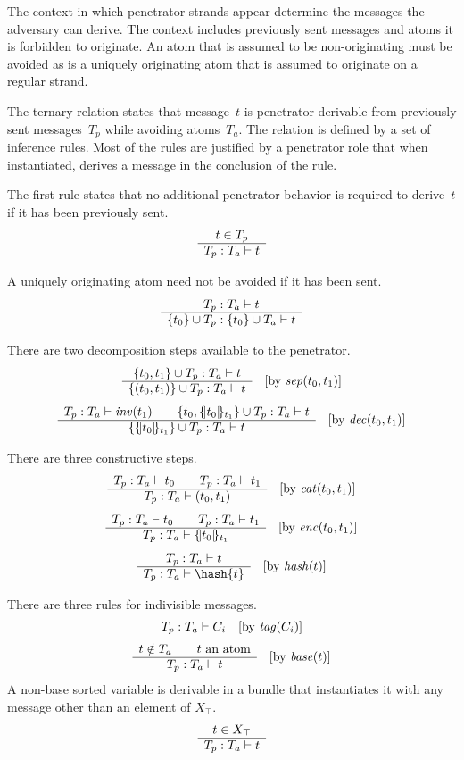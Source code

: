 \documentclass[12pt]{report}
\theoremstyle{definition}
\begin{document}
The context in which penetrator strands appear determine the messages
the adversary can derive.  The context includes previously sent
messages and atoms it is forbidden to originate.  An atom that is
assumed to be non-originating must be avoided as is a uniquely
originating atom that is assumed to originate on a regular strand.

The ternary relation  states that message~$t$ is
penetrator derivable from previously sent messages~$T_p$ while
avoiding atoms~$T_a$.  The relation is defined by a set of inference
rules.  Most of the rules are justified by a penetrator role that when
instantiated, derives a message in the conclusion of the rule.

The first rule states that no additional penetrator behavior is required
to derive~$t$ if it has been previously sent.
$$\infer{t\in{T_p}}{\der{t}{T_p}{T_a}}$$

A uniquely originating atom need not be avoided if it has been sent.
\begin{equation}\label{eqn:avoid}
\infer{\der{t}{T_p}{T_a}}%
{\der{t}{\{t_0\}\cup T_p}{\{t_0\}\cup T_a}}
\end{equation}

There are two decomposition steps available to the penetrator.
\begin{equation}\label{eqn:sep}
\infer{\der{t}{\{t_0,t_1\}\cup T_p}{T_a}}%
{\der{t}{\{(t_0,t_1)\}\cup T_p}{T_a}}\quad
[\mbox{by $\fn{sep}(t_0,t_1)$}]
\end{equation}
\begin{equation}\label{eqn:dec}
\infer{\der{\fn{inv}(t_1)}{T_p}{T_a}\qquad
\der{t}{\{t_0,\enc{t_0}{t_1}\}\cup T_p}{T_a}}%
{\der{t}{\{\enc{t_0}{t_1}\}\cup T_p}{T_a}}\quad
[\mbox{by $\fn{dec}(t_0,t_1)$}]
\end{equation}

There are three constructive steps.
$$\infer{\der{t_0}{T_p}{T_a}\qquad\der{t_1}{T_p}{T_a}}%
{\der{(t_0,t_1)}{T_p}{T_a}}\quad
[\mbox{by $\fn{cat}(t_0,t_1)$}]$$
$$\infer{\der{t_0}{T_p}{T_a}\qquad\der{t_1}{T_p}{T_a}}%
{\der{\enc{t_0}{t_1}}{T_p}{T_a}}\quad
[\mbox{by $\fn{enc}(t_0,t_1)$}]$$
$$\infer{\der{t}{T_p}{T_a}}%
{\der{\hash{t}}{T_p}{T_a}}\quad
[\mbox{by $\fn{hash}(t)$}]$$

There are three rules for indivisible messages.
$$\der{C_i}{T_p}{T_a}\quad
[\mbox{by $\fn{tag}(C_i)$}]$$
$$\infer{t\notin T_a\qquad\mbox{$t$ an atom}}%
{\der{t}{T_p}{T_a}}\quad
[\mbox{by $\fn{base}(t)$}]$$
A non-base sorted variable is derivable in a bundle that instantiates
it with any message other than an element of $X_\top$.
$$\infer{t\in X_\top}{\der{t}{T_p}{T_a}}$$
\end{document}
